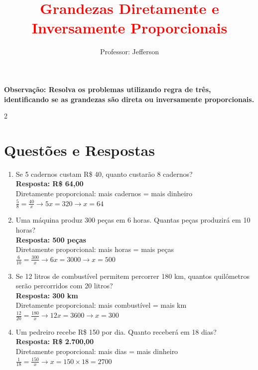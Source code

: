 \documentclass[11pt]{article}
\title{\textbf{\textcolor{red}{Grandezas Diretamente e Inversamente Proporcionais}}}
\author{Professor: Jefferson}
\date{}
\begin{document}
\maketitle
\vspace{-0.5cm}

\begin{justify}
\textbf{Observação: Resolva os problemas utilizando regra de três, identificando se as grandezas são direta ou inversamente proporcionais.}
\end{justify}

\begin{multicols}{2}

\section*{Questões e Respostas}

\begin{enumerate}[leftmargin=*, itemsep=15pt]

\item Se 5 cadernos custam R\$ 40, quanto custarão 8 cadernos? \\
\textbf{Resposta: R\$ 64,00} \\
Diretamente proporcional: mais cadernos = mais dinheiro \\
$\frac{5}{8} = \frac{40}{x} \rightarrow 5x = 320 \rightarrow x = 64$

\item Uma máquina produz 300 peças em 6 horas. Quantas peças produzirá em 10 horas? \\
\textbf{Resposta: 500 peças} \\
Diretamente proporcional: mais horas = mais peças \\
$\frac{6}{10} = \frac{300}{x} \rightarrow 6x = 3000 \rightarrow x = 500$

\item Se 12 litros de combustível permitem percorrer 180 km, quantos quilômetros serão percorridos com 20 litros? \\
\textbf{Resposta: 300 km} \\
Diretamente proporcional: mais combustível = mais km \\
$\frac{12}{20} = \frac{180}{x} \rightarrow 12x = 3600 \rightarrow x = 300$

\item Um pedreiro recebe R\$ 150 por dia. Quanto receberá em 18 dias? \\
\textbf{Resposta: R\$ 2.700,00} \\
Diretamente proporcional: mais dias = mais dinheiro \\
$\frac{1}{18} = \frac{150}{x} \rightarrow x = 150 \times 18 = 2700$


\end{enumerate}
\end{multicols}
\end{document}

